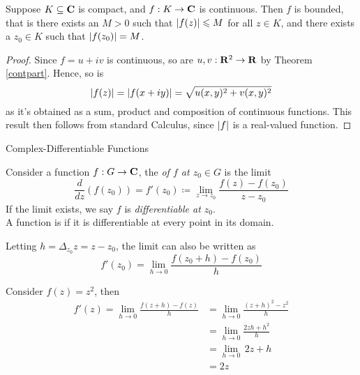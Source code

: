 \begin{theorem}\label{evt}
Suppose $K \subseteq \mathbf C$ is compact, and $f: K \to \mathbf C$ is continuous. Then $f$ is bounded, that is there exists an $M > 0$ such that $\left\lvert f(z)\right\rvert \leqslant M$ for all $z \in K$, and there exists a $z_0 \in K$ such that $\left\lvert f(z_0)\right\rvert = M$.
\end{theorem}
\begin{proof}
Since $f = u + iv$ is continuous, so are $u,v:\mathbf R^2 \to \mathbf R$ by Theorem \ref{contpart}.  Hence, so is
\[\left\lvert f(z)\right\rvert = \left\lvert f(x + iy)\right\rvert = \sqrt{u(x,y)^2 + v(x,y)^2}\]
as it's obtained as a sum, product and composition of continuous functions. This result then follows from standard Calculus, since $\left\lvert f\right\rvert$ is a real-valued function.
\end{proof}

\vspace*{2em}

\begin{mdframed}
\begin{center}
{\Large Complex-Differentiable Functions}
\end{center}
\end{mdframed}

\begin{definition}[Derivative]\label{cmplxder}
Consider a function $f:G \to \mathbf C$, the  \emph{of $f$ at $z_0 \in G$} is the limit
\[\frac{d}{dz}(f(z_0)) = f'(z_0) \coloneqq \lim_{z \to z_0}\frac{f(z) - f(z_0)}{z - z_0}\]
If the limit exists, we say $f$ is \emph{differentiable at $z_0$}.\\[0.5em]
A function is  if it is differentiable at every point in its domain.
\end{definition}
Letting $h = \Delta_{z_0}z = z - z_0$, the limit can also be written as
\[f'(z_0) = \lim_{h \to 0}\frac{f(z_0 + h) - f(z_0)}{h}\]

\vspace*{1em}

\begin{example}
Consider $f(z) = z^2$, then
\begin{align*}
f'(z) = \lim_{h \to 0}\frac{f(z + h) - f(z)}{h} &= \lim_{h \to 0}\frac{(z + h)^2 - z^2}{h}\\[0.5em]
&= \lim_{h \to 0}\frac{2zh + h^2}{h}\\[0.5em]
&= \lim_{h \to 0}\,2z + h\\[0.5em]
&= 2z
\end{align*}
\end{example}

